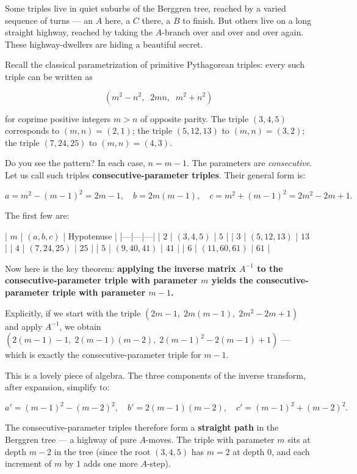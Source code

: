 \documentclass[11pt,openright,twoside]{book}
\theoremstyle{definition}
\begin{document}
Some triples live in quiet suburbs of the Berggren tree, reached by a varied sequence of turns --- an $A$ here, a $C$ there, a $B$ to finish. But others live on a long straight highway, reached by taking the $A$-branch over and over and over again. These highway-dwellers are hiding a beautiful secret.

Recall the classical parametrization of primitive Pythagorean triples: every such triple can be written as

\[(m^2 - n^2,\;\; 2mn,\;\; m^2 + n^2)\]

for coprime positive integers $m > n$ of opposite parity. The triple $(3, 4, 5)$ corresponds to $(m, n) = (2, 1)$; the triple $(5, 12, 13)$ to $(m, n) = (3, 2)$; the triple $(7, 24, 25)$ to $(m, n) = (4, 3)$.

Do you see the pattern? In each case, $n = m - 1$. The parameters are \textit{consecutive}. Let us call such triples \textbf{consecutive-parameter triples}. Their general form is:

\[a = m^2 - (m-1)^2 = 2m - 1, \quad b = 2m(m-1), \quad c = m^2 + (m-1)^2 = 2m^2 - 2m + 1.\]

The first few are:

| $m$ | $(a, b, c)$ | Hypotenuse |
|---|---|---|
| $2$ | $(3, 4, 5)$ | $5$ |
| $3$ | $(5, 12, 13)$ | $13$ |
| $4$ | $(7, 24, 25)$ | $25$ |
| $5$ | $(9, 40, 41)$ | $41$ |
| $6$ | $(11, 60, 61)$ | $61$ |

Now here is the key theorem: \textbf{applying the inverse matrix $A^{-1}$ to the consecutive-parameter triple with parameter $m$ yields the consecutive-parameter triple with parameter $m - 1$.}

Explicitly, if we start with the triple $(2m - 1,\; 2m(m-1),\; 2m^2 - 2m + 1)$ and apply $A^{-1}$, we obtain $(2(m-1) - 1,\; 2(m-1)(m-2),\; 2(m-1)^2 - 2(m-1) + 1)$ --- which is exactly the consecutive-parameter triple for $m - 1$.

This is a lovely piece of algebra. The three components of the inverse transform, after expansion, simplify to:

\[a' = (m-1)^2 - (m-2)^2, \quad b' = 2(m-1)(m-2), \quad c' = (m-1)^2 + (m-2)^2.\]

The consecutive-parameter triples therefore form a \textbf{straight path} in the Berggren tree --- a highway of pure $A$-moves. The triple with parameter $m$ sits at depth $m - 2$ in the tree (since the root $(3, 4, 5)$ has $m = 2$ at depth $0$, and each increment of $m$ by $1$ adds one more $A$-step).
\end{document}
